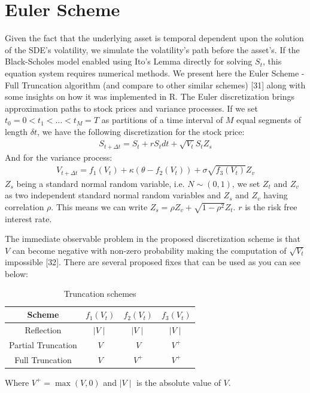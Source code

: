 \documentclass[12pt,twoside]{reedthesis}
\theoremstyle{definition}
\theoremstyle{definition}
\theoremstyle{remark}
\begin{document}
  \section{Euler Scheme}\label{euler-scheme}
  
  Given the fact that the underlying asset is temporal dependent upon the
  solution of the SDE's volatility, we simulate the volatility's path
  before the asset's. If the Black-Scholes model enabled using Ito's Lemma
  directly for solving \(S_t\), this equation system requires numerical
  methods. We present here the Euler Scheme - Full Truncation algorithm
  (and compare to other similar schemes) {[}31{]} along with some insights
  on how it was implemented in R. The Euler discretization brings
  approximation paths to stock prices and variance processes. If we set
  \(t_0 = 0 < t_1 < \dots < t_M = T\) as partitions of a time interval of
  \(M\) equal segments of length \(\delta t\), we have the following
  discretization for the stock price:
  \begin{align}
  S_{t + \Delta t} = S_t + rS_t dt + \sqrt{V_t} S_t Z_s
  \end{align}
  \noindent
  And for the variance process:
  \begin{align}
  V_{t + \Delta t} = f_1(V_{t}) + \kappa (\theta - f_2(V_{t})) + \sigma \sqrt{f_3(V_{t})} Z_v 
  \end{align}
  \noindent
  \(Z_s\) being a standard normal random variable, i.e. \(N\sim(0,1)\), we
  set \(Z_t\) and \(Z_v\) as two independent standard normal random
  variables and \(Z_s\) and \(Z_v\) having correlation \(\rho\). This
  means we can write \(Z_s = \rho Z_v + \sqrt{1-\rho^2} Z_t\). \(r\) is
  the risk free interest rate.
  
  The immediate observable problem in the proposed discretization scheme
  is that \(V\) can become negative with non-zero probability making the
  computation of \(\sqrt{V_t}\) impossible {[}32{]}. There are several
  proposed fixes that can be used as you can see below:
  \begin{table}[ht]
  \centering
  \begin{tabular}{cccc}
    \hline 
  Scheme & $f_1(V_{t})$ & $f_2(V_{t})$ & $f_3(V_{t})$ \\ 
    \hline 
  Reflection & $\mid V \mid$ & $\mid V \mid$ & $\mid V \mid$ \\ 
    Partial Truncation & $V$ & $V$ & $V^+$ \\ 
    Full Truncation & $V$ & $V^+$ & $V^+$ \\ 
     \hline 
  \end{tabular}
  \caption{Truncation schemes} 
  \label{box}
  \end{table}
  Where \(V^+ = \max(V,0)\) and \(\mid V \mid\) is the absolute value of
  \(V\).
  
\end{document}
